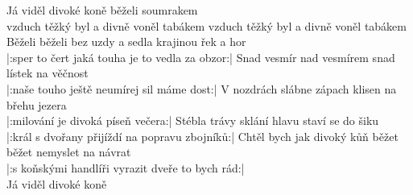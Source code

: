 \ve{}
Já viděl divoké koně
běželi soumrakem\\
vzduch těžký byl a divně voněl
tabákem
vzduch těžký byl a divně voněl
tabákem
\ve{}
Běželi běželi bez uzdy a sedla
krajinou řek a hor\\
|:sper to čert jaká touha je to vedla
za obzor:|
\ve{}
Snad vesmír nad vesmírem
snad lístek na věčnost\\
|:naše touho ještě neumírej
sil máme dost:|
\ve{}
V nozdrách slábne zápach klisen
na břehu jezera\\
|:milování je divoká píseň
večera:|
\ve{}
Stébla trávy sklání hlavu
staví se do šiku\\
|:král s dvořany přijíždí na popravu
zbojníků:|
\ve{}
Chtěl bych jak divoký kůň běžet běžet
nemyslet na návrat\\
|:s koňskými handlíři vyrazit dveře
to bych rád:|\\
Já viděl divoké koně
\esong{}